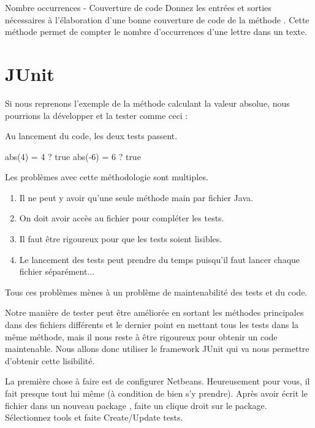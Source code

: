 \documentclass[a4paper,11pt]{style-esi/td}
\begin{document}
	\begin{Exercice}{Nombre occurrences - Couverture de code}
		Donnez les entrées et sorties nécessaires à l’élaboration d’une bonne couverture de code de la méthode . Cette méthode permet de compter le nombre d'occurrences d’une lettre dans un texte.
	\end{Exercice}

\section{JUnit}

	Si nous reprenons l’exemple de la méthode calculant la valeur absolue, nous pourrions la développer et la tester comme ceci :

	Au lancement du code, les deux tests passent.
	\begin{Console}
		abs(4) = 4 ? true
		abs(-6) = 6 ? true
	\end{Console}

	Les problèmes avec cette méthodologie sont multiples.
	\begin{enumerate}
		\item Il ne peut y avoir qu’une seule méthode main par fichier Java.
 		\item On doit avoir accès au fichier pour compléter les tests.
 		\item Il faut être rigoureux pour que les tests soient lisibles.
 		\item Le lancement des tests peut prendre du temps puisqu'il faut lancer chaque fichier séparément...
	\end{enumerate}
	Tous ces problèmes mènes à un problème de maintenabilité des tests et du code.

	Notre manière de tester peut être améliorée en sortant les méthodes principales dans des fichiers différents et le dernier point en mettant tous les tests dans la même méthode, mais il nous reste à être rigoureux pour obtenir un code maintenable. Nous allons donc utiliser le framework JUnit qui va nous permettre d'obtenir cette lisibilité.

	La première chose à faire est de configurer Netbeans. Heureusement pour vous, il fait presque tout lui même (à condition de bien s’y prendre).
	Après avoir écrit le fichier  dans un nouveau package , faite un clique droit sur le package. Sélectionnez tools et faite Create/Update tests.
\end{document}

